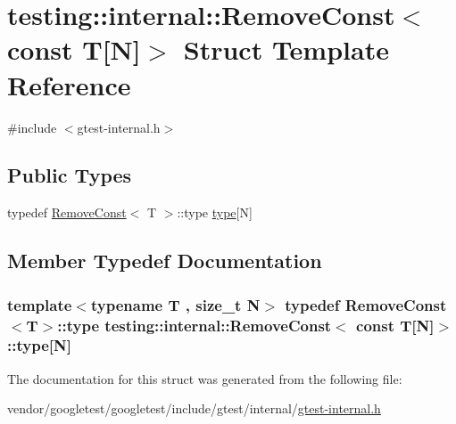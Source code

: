 \hypertarget{structtesting_1_1internal_1_1RemoveConst_3_01const_01T[N]_4}{}\section{testing\+:\+:internal\+:\+:Remove\+Const$<$ const T\mbox{[}N\mbox{]}$>$ Struct Template Reference}
\label{structtesting_1_1internal_1_1RemoveConst_3_01const_01T[N]_4}


{\ttfamily \#include $<$gtest-\/internal.\+h$>$}

\subsection*{Public Types}
\begin{DoxyCompactItemize}
\item 
typedef \hyperlink{structtesting_1_1internal_1_1RemoveConst}{Remove\+Const}$<$ T $>$\+::type \hyperlink{structtesting_1_1internal_1_1RemoveConst_3_01const_01T[N]_4_ac976b53cb5d031a120fafbe790650068}{type}\mbox{[}N\mbox{]}
\end{DoxyCompactItemize}


\subsection{Member Typedef Documentation}
\subsubsection[{\texorpdfstring{type}{type}}]{\setlength{\rightskip}{0pt plus 5cm}template$<$typename T , size\+\_\+t N$>$ typedef {\bf Remove\+Const}$<$T$>$\+::type {\bf testing\+::internal\+::\+Remove\+Const}$<$ const T\mbox{[}N\mbox{]}$>$\+::type\mbox{[}N\mbox{]}}\hypertarget{structtesting_1_1internal_1_1RemoveConst_3_01const_01T[N]_4_ac976b53cb5d031a120fafbe790650068}{}\label{structtesting_1_1internal_1_1RemoveConst_3_01const_01T[N]_4_ac976b53cb5d031a120fafbe790650068}


The documentation for this struct was generated from the following file\+:\begin{DoxyCompactItemize}
\item 
vendor/googletest/googletest/include/gtest/internal/\hyperlink{gtest-internal_8h}{gtest-\/internal.\+h}\end{DoxyCompactItemize}
